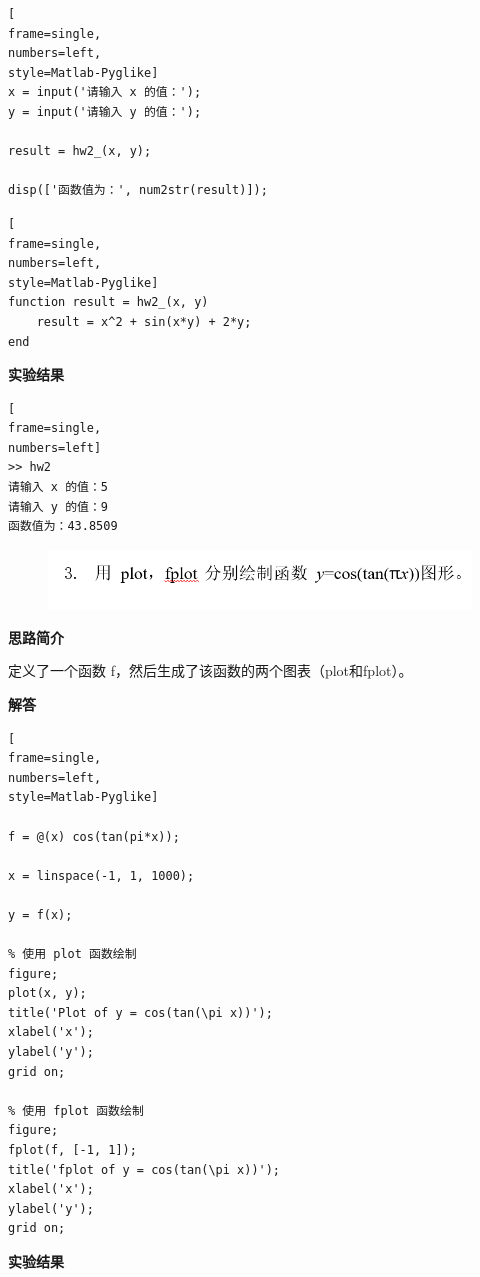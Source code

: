 \documentclass[12pt,UTF8]{ctexart}
\begin{document}
\begin{lstlisting}[
frame=single,
numbers=left,
style=Matlab-Pyglike]
x = input('请输入 x 的值：');
y = input('请输入 y 的值：');

result = hw2_(x, y);

disp(['函数值为：', num2str(result)]);
\end{lstlisting}
\begin{lstlisting}[
frame=single,
numbers=left,
style=Matlab-Pyglike]
function result = hw2_(x, y)
    result = x^2 + sin(x*y) + 2*y;
end
\end{lstlisting}

\par \textbf{实验结果}

\begin{lstlisting}[
frame=single,
numbers=left]
>> hw2
请输入 x 的值：5
请输入 y 的值：9
函数值为：43.8509
\end{lstlisting}
\clearpage


\begin{figure}
    \centering
    \includegraphics[width=1\linewidth]{++3.png}
\end{figure}
\par \textbf{思路简介}
\par 定义了一个函数 f，然后生成了该函数的两个图表（plot和fplot）。
\par \textbf{解答}

\begin{lstlisting}[
frame=single,
numbers=left,
style=Matlab-Pyglike]

f = @(x) cos(tan(pi*x));

x = linspace(-1, 1, 1000);

y = f(x);

% 使用 plot 函数绘制
figure;
plot(x, y);
title('Plot of y = cos(tan(\pi x))');
xlabel('x');
ylabel('y');
grid on;

% 使用 fplot 函数绘制
figure;
fplot(f, [-1, 1]);
title('fplot of y = cos(tan(\pi x))');
xlabel('x');
ylabel('y');
grid on;

\end{lstlisting}

\par \textbf{实验结果}
\end{document}
